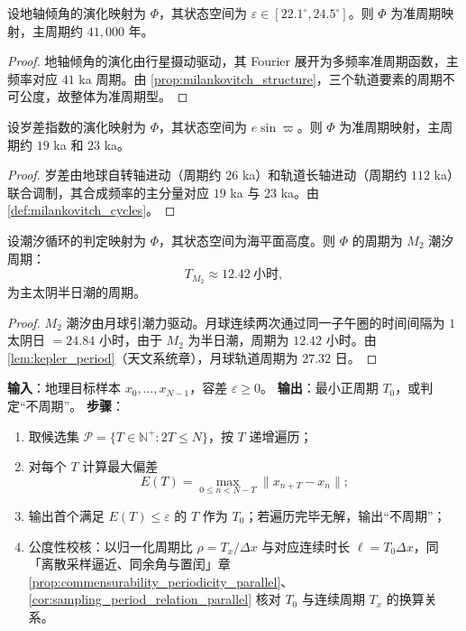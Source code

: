 \begin{lemma}[地轴倾角的长周期判定]\label{lem:geo_obliquity_period}
设地轴倾角的演化映射为 $\Phi$，其状态空间为 $\varepsilon\in[22.1^\circ,24.5^\circ]$。则 $\Phi$ 为准周期映射，主周期约 $41,000$ 年。
\end{lemma}

\begin{proof}
地轴倾角的演化由行星摄动驱动，其 Fourier 展开为多频率准周期函数，主频率对应 $41$ ka 周期。由 \cref{prop:milankovitch_structure}，三个轨道要素的周期不可公度，故整体为准周期型。
\end{proof}

\begin{lemma}[岁差指数的多频率判定]\label{lem:geo_precession_period}
设岁差指数的演化映射为 $\Phi$，其状态空间为 $e\sin\varpi$。则 $\Phi$ 为准周期映射，主周期约 $19$ ka 和 $23$ ka。
\end{lemma}

\begin{proof}
岁差由地球自转轴进动（周期约 $26$ ka）和轨道长轴进动（周期约 $112$ ka）联合调制，其合成频率的主分量对应 $19$ ka 与 $23$ ka。由 \cref{def:milankovitch_cycles}。
\end{proof}

\begin{lemma}[潮汐循环的周期判定]\label{lem:geo_tidal_period}
设潮汐循环的判定映射为 $\Phi$，其状态空间为海平面高度。则 $\Phi$ 的周期为 $M_2$ 潮汐周期：
\[
T_{M_2}\approx 12.42\ \text{小时},
\]
为主太阴半日潮的周期。
\end{lemma}

\begin{proof}
$M_2$ 潮汐由月球引潮力驱动。月球连续两次通过同一子午圈的时间间隔为 $1$ 太阴日 $=24.84$ 小时，由于 $M_2$ 为半日潮，周期为 $12.42$ 小时。由 \cref{lem:kepler_period}（天文系统章），月球轨道周期为 $27.32$ 日。
\end{proof}

\begin{definition}[地理最小正周期算法]\label{def:geo_minimal_period_algorithm}
\textbf{输入}：地理目标样本 $x_0,\dots,x_{N-1}$，容差 $\varepsilon\ge0$。
\textbf{输出}：最小正周期 $T_0$，或判定“不周期”。
\textbf{步骤}：
\begin{enumerate}[label=(\arabic*)]
    \item 取候选集 $\mathcal P=\{T\in\mathbb N^+:2T\le N\}$，按 $T$ 递增遍历；
    \item 对每个 $T$ 计算最大偏差
    \[
    E(T)=\max_{0\le n<N-T}\|x_{n+T}-x_n\|;
    \]
    \item 输出首个满足 $E(T)\le\varepsilon$ 的 $T$ 作为 $T_0$；若遍历完毕无解，输出“不周期”；
    \item 公度性校核：以归一化周期比 $\rho=T_x/\Delta x$ 与对应连续时长 $\ell=T_0\Delta x$，同「离散采样逼近、同余角与置闰」章 \cref{prop:commensurability_periodicity_parallel}、\cref{cor:sampling_period_relation_parallel} 核对 $T_0$ 与连续周期 $T_x$ 的换算关系。
\end{enumerate}
\end{definition}

